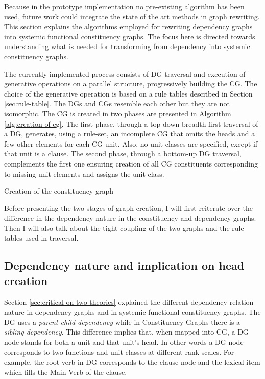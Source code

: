     Because in the prototype implementation no pre-existing algorithm has been used, future work could integrate the state of the art methods in graph rewriting. This section explains the algorithms employed for rewriting dependency graphs into systemic functional constituency graphs. The focus here is directed towards understanding what is needed for transforming from dependency into systemic constituency graphs.  
 
    The currently implemented process consists of DG traversal and execution of generative operations on a parallel structure, progressively building the CG. The choice of the generative operation is based on a rule tables described in Section \ref{sec:rule-table}. The DGs and CGs resemble each other but they are not isomorphic. The CG is created in two phases are presented in Algorithm \ref{alg:creation-of-cg}. The first phase, through a top-down breadth-first traversal of a DG, generates, using a rule-set, an incomplete CG that omits the heads and a few other elements for each CG unit. Also, no unit classes are specified, except if that unit is a clause. The second phase, through a bottom-up DG traversal, complements the first one ensuring creation of all CG constituents corresponding to missing unit elements and assigns the unit class. 

    \begin{algorithm}[!ht]
    	\caption{Creation of the constituency graph}
    	\label{alg:creation-of-cg}
    \end{algorithm}

    Before presenting the two stages of graph creation, I will first reiterate over the difference in the dependency nature in the constituency and dependency graphs. Then I will also talk about the tight coupling of the two graphs and the rule tables used in traversal. 

\subsection{Dependency nature and implication on head creation}
\label{sec:dep-implications}
    Section \ref{sec:critical-on-two-theories} explained the different dependency relation nature in dependency graphs and in systemic functional constituency graphs. The DG uses a \textit{parent-child dependency} while in Constituency Graphs there is a \textit{sibling dependency}. This difference implies that, when mapped into CG, a DG node stands for both a unit and that unit's head. In other words a DG node corresponds to two functions and unit classes at different rank scales. For example, the root verb in DG corresponds to the clause node and the lexical item which fills the Main Verb of the clause. 

